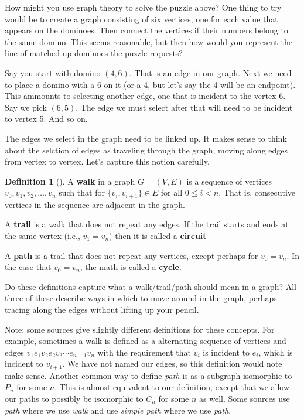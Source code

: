 \documentclass[10pt,]{book}
\newcommand{\terminology}[1]{\textbf{#1}}
\theoremstyle{plain}
\theoremstyle{definition}
\newtheorem{definition}[theorem]{Definition}
\theoremstyle{definition}
\theoremstyle{definition}
\numberwithin{equation}{chapter}
\newcommand{\lt}{<}
\begin{document}
\hypertarget{p-127}{}%
How might you use graph theory to solve the puzzle above?  One thing to try would be to create a graph consisting of six vertices, one for each value that appears on the dominoes.  Then connect the vertices if their numbers belong to the same domino.  This seems reasonable, but then how would you represent the line of matched up dominoes the puzzle requests?%
\par
\hypertarget{p-128}{}%
Say you start with domino \((4,6)\).  That is an edge in our graph.  Next we need to place a domino with a 6 on it (or a 4, but let's say the 4 will be an endpoint).  This ammounts to selecting another edge, one that is incident to the vertex 6.  Say we pick \((6,5)\).  The edge we must select after that will need to be incident to vertex 5.  And so on.%
\par
\hypertarget{p-129}{}%
The edges we select in the graph need to be linked up.  It makes sense to think about the selction of edges as traveling through the graph, moving along edges from vertex to vertex.  Let's capture this notion carefully.%
\begin{definition}[{}]\label{def-walk}
\hypertarget{p-130}{}%
A \terminology{walk} in a graph \(G = (V,E)\) is a sequence of vertices \(v_0, v_1, v_2, \ldots, v_n\) such that for \(\{v_i, v_{i+1}\} \in E\) for all \(0 \le i \lt n\).  That is, consecutive vertices in the sequence are adjacent in the graph.%
\par
\hypertarget{p-131}{}%
A \terminology{trail} is a walk that does not repeat any edges.  If the trail starts and ends at the same vertex (i.e., \(v_1 = v_n\)) then it is called a \terminology{circuit}%
\par
\hypertarget{p-132}{}%
A \terminology{path} is a trail that does not repeat any vertices, except perhaps for \(v_0 = v_n\).  In the case that \(v_0 = v_n\), the math is called a \terminology{cycle}.%
\end{definition}
\hypertarget{p-133}{}%
Do these definitions capture what a walk/trail/path should mean in a graph?  All three of these describe ways in which to move around in the graph, perhaps tracing along the edges without lifting up your pencil.%
\par
\hypertarget{p-134}{}%
Note: some sources give slightly different definitions for these concepts.  For example, sometimes a walk is defined as a alternating sequence of vertices and edges \(v_1e_1v_2e_2v_3\cdots e_{n-1}v_n\) with the requirement that \(v_i\) is incident to \(e_i\), which is incident to \(v_{i+1}\).  We have not named our edges, so this definition would note make sense.  Another common way to define \emph{path} is as a subgraph isomorphic to \(P_n\) for some \(n\).  This is almost equivalent to our definition, except that we allow our paths to possibly be isomorphic to \(C_n\) for some \(n\) as well.  Some sources use \emph{path} where we use \emph{walk} and use \emph{simple path} where we use \emph{path}.%
\end{document}
